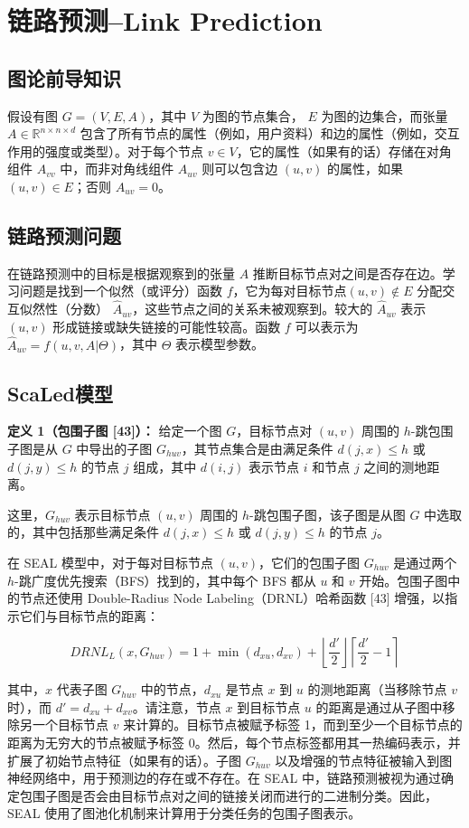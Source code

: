 \documentclass{article}
\begin{document}
\section*{链路预测--Link Prediction}
\subsection*{图论前导知识}
假设有图 $G = (V, E, A)$，其中 $V$ 为图的节点集合，
$E$ 为图的边集合，而张量 $A \in \mathbb{R}^{n \times n \times d}$ 
包含了所有节点的属性（例如，用户资料）和边的属性（例如，交互作用的强度或类型）。对于每个节点 $v \in V$，它的属性（如果有的话）存储在对角组件 $A_{vv}$ 中，而非对角线组件 $A_{uv}$ 则可以包含边 $(u, v)$ 的属性，如果 $(u, v) \in E$；否则 $A_{uv} = 0$。
\subsection*{链路预测问题}
在链路预测中的目标是根据观察到的张量 $A$ 推断目标节点对之间是否存在边。学习问题是找到一个似然（或评分）函数 $f$，它为每对目标节点$(u, v) \notin E$ 分配交互似然性（分数） $\hat{A}_{uv}$，这些节点之间的关系未被观察到。较大的 $\hat{A}_{uv}$ 表示 $(u, v)$ 形成链接或缺失链接的可能性较高。函数 $f$ 可以表示为 $\hat{A}_{uv} = f(u, v, A|\Theta)$，其中 $\Theta$ 表示模型参数。
\subsection*{ScaLed模型}
\textbf{定义 1（包围子图 [43]）：} 给定一个图 $G$，目标节点对 $(u,v)$ 周围的 $h$-跳包围子图是从 $G$ 中导出的子图 $G_{huv}$，其节点集合是由满足条件 $d(j, x) \leq h$ 或 $d(j, y) \leq h$ 的节点 $j$ 组成，其中 $d(i, j)$ 表示节点 $i$ 和节点 $j$ 之间的测地距离。

这里，$G_{huv}$ 表示目标节点 $(u,v)$ 周围的 $h$-跳包围子图，该子图是从图 $G$ 中选取的，其中包括那些满足条件 $d(j, x) \leq h$ 或 $d(j, y) \leq h$ 的节点 $j$。

在 SEAL 模型中，对于每对目标节点 $(u, v)$，它们的包围子图 $G_{huv}$ 是通过两个 $h$-跳广度优先搜索（BFS）找到的，其中每个 BFS 都从 $u$ 和 $v$ 开始。包围子图中的节点还使用 Double-Radius Node Labeling（DRNL）哈希函数 [43] 增强，以指示它们与目标节点的距离：

\[
DRNL_L(x, G_{huv}) = 1 + \min(d_{xu}, d_{xv}) + \left\lfloor \frac{d'}{2} \right\rfloor \left\lceil \frac{d'}{2} - 1 \right\rceil
\]

其中，$x$ 代表子图 $G_{huv}$ 中的节点，$d_{xu}$ 是节点 $x$ 到 $u$ 的测地距离（当移除节点 $v$ 时），而 $d' = d_{xu} + d_{xv}$。请注意，节点 $x$ 到目标节点 $u$ 的距离是通过从子图中移除另一个目标节点 $v$ 来计算的。目标节点被赋予标签 1，而到至少一个目标节点的距离为无穷大的节点被赋予标签 0。然后，每个节点标签都用其一热编码表示，并扩展了初始节点特征（如果有的话）。子图 $G_{huv}$ 以及增强的节点特征被输入到图神经网络中，用于预测边的存在或不存在。在 SEAL 中，链路预测被视为通过确定包围子图是否会由目标节点对之间的链接关闭而进行的二进制分类。因此，SEAL 使用了图池化机制来计算用于分类任务的包围子图表示。
\end{document}

